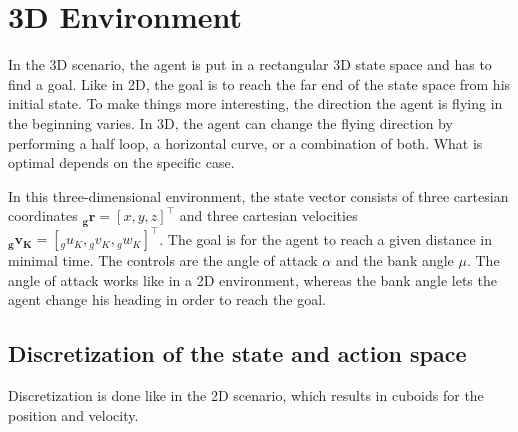 \section{3D Environment}

In the 3D scenario, the agent is put in a rectangular 3D state space and has to find a goal. Like in 2D, the goal is to reach the far end of the state space from his initial state. To make things more interesting, the direction the agent is flying in the beginning varies. In 3D, the agent can change the flying direction by performing a half loop, a horizontal curve, or a combination of both. What is optimal depends on the specific case.

In this three-dimensional environment, the state vector consists of three cartesian coordinates $\boldsymbol{{}_g r}=[x,y,z]^\top$ and three cartesian velocities $\boldsymbol{{}_g v_K}=[{}_g u_K,{}_g v_K,{}_g w_K]^\top$. The goal is for the agent to reach a given distance in minimal time. The controls are the angle of attack $\alpha$ and the bank angle $\mu$. The angle of attack works like in a 2D environment, whereas the bank angle lets the agent change his heading in order to reach the goal.

\subsection{Discretization of the state and action space}
\label{sec:disc3d}

Discretization is done like in the 2D scenario, which results in cuboids for the position and velocity.